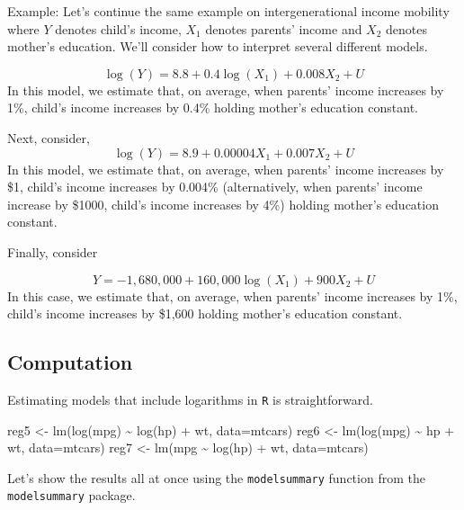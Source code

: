\documentclass[
  letterpaper,
  DIV=11,
  numbers=noendperiod]{scrreprt}
\newenvironment{Shaded}{\begin{snugshade}}{\end{snugshade}}
\newcommand{\AttributeTok}[1]{\textcolor[rgb]{0.40,0.45,0.13}{#1}}
\newcommand{\FunctionTok}[1]{\textcolor[rgb]{0.28,0.35,0.67}{#1}}
\newcommand{\NormalTok}[1]{\textcolor[rgb]{0.00,0.23,0.31}{#1}}
\newcommand{\OtherTok}[1]{\textcolor[rgb]{0.00,0.23,0.31}{#1}}
\newcommand{\SpecialCharTok}[1]{\textcolor[rgb]{0.37,0.37,0.37}{#1}}
\begin{document}
{Example: }Let's continue the same example on intergenerational income
mobility where \(Y\) denotes child's income, \(X_1\) denotes parents'
income and \(X_2\) denotes mother's education. We'll consider how to
interpret several different models.

\[
  \log(Y) = 8.8 + 0.4 \log(X_1) + 0.008 X_2 + U
\] In this model, we estimate that, on average, when parents' income
increases by 1\%, child's income increases by 0.4\% holding mother's
education constant.

Next, consider, \[
  \log(Y) = 8.9 + 0.00004 X_1 + 0.007 X_2 + U
\] In this model, we estimate that, on average, when parents' income
increases by \$1, child's income increases by 0.004\% (alternatively,
when parents' income increase by \$1000, child's income increases by
4\%) holding mother's education constant.

Finally, consider

\[
  Y = -1,680,000 + 160,000 \log(X_1) + 900 X_2 + U
\] In this case, we estimate that, on average, when parents' income
increases by 1\%, child's income increases by \$1,600 holding mother's
education constant.

\subsection{Computation}\label{computation-5}

Estimating models that include logarithms in \texttt{R} is
straightforward.

\begin{Shaded}
\begin{Highlighting}[]
\NormalTok{reg5 }\OtherTok{\textless{}{-}} \FunctionTok{lm}\NormalTok{(}\FunctionTok{log}\NormalTok{(mpg) }\SpecialCharTok{\textasciitilde{}} \FunctionTok{log}\NormalTok{(hp) }\SpecialCharTok{+}\NormalTok{ wt, }\AttributeTok{data=}\NormalTok{mtcars) }
\NormalTok{reg6 }\OtherTok{\textless{}{-}} \FunctionTok{lm}\NormalTok{(}\FunctionTok{log}\NormalTok{(mpg) }\SpecialCharTok{\textasciitilde{}}\NormalTok{ hp }\SpecialCharTok{+}\NormalTok{ wt, }\AttributeTok{data=}\NormalTok{mtcars) }
\NormalTok{reg7 }\OtherTok{\textless{}{-}} \FunctionTok{lm}\NormalTok{(mpg }\SpecialCharTok{\textasciitilde{}} \FunctionTok{log}\NormalTok{(hp) }\SpecialCharTok{+}\NormalTok{ wt, }\AttributeTok{data=}\NormalTok{mtcars)}
\end{Highlighting}
\end{Shaded}

Let's show the results all at once using the \texttt{modelsummary}
function from the \texttt{modelsummary} package.
\end{document}
